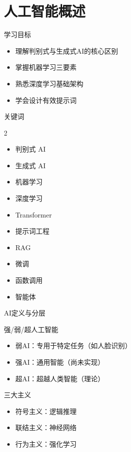 \small
\section{人工智能概述}

\begin{frame}{学习目标}
\begin{itemize}
    \item 理解判别式与生成式AI的核心区别
    \item 掌握机器学习三要素
    \item 熟悉深度学习基础架构
    \item 学会设计有效提示词
\end{itemize}
\end{frame}

\begin{frame}{关键词}
\begin{multicols}{2}
\begin{itemize}
    \item 判别式 AI
    \item 生成式 AI
    \item 机器学习
    \item 深度学习
    \item Transformer
    \item 提示词工程
    \item RAG
    \item 微调
    \item 函数调用
    \item 智能体
\end{itemize}
\end{multicols}
\end{frame}

\begin{frame}{AI定义与分层}
\begin{block}{强/弱/超人工智能}
\begin{itemize}
    \item 弱AI：专用于特定任务（如人脸识别）
    \item 强AI：通用智能（尚未实现）
    \item 超AI：超越人类智能（理论）
\end{itemize}
\end{block}
\begin{block}{三大主义}
\begin{itemize}
    \item 符号主义：逻辑推理
    \item 联结主义：神经网络
    \item 行为主义：强化学习
\end{itemize}
\end{block}
\end{frame}

